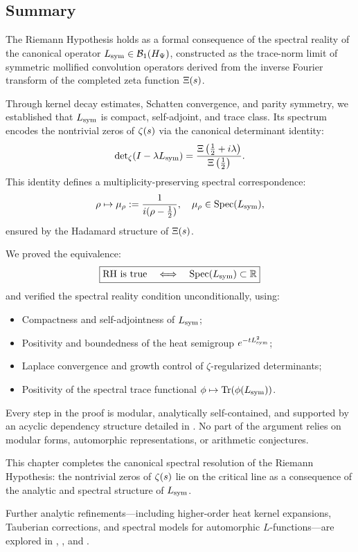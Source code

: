 \subsection*{Summary}

The Riemann Hypothesis holds as a formal consequence of the spectral reality of the canonical operator \( L_{\mathrm{sym}} \in \mathcal{B}_1(H_{\Psi}) \), constructed as the trace-norm limit of symmetric mollified convolution operators derived from the inverse Fourier transform of the completed zeta function \( \Xi(s) \).

Through kernel decay estimates, Schatten convergence, and parity symmetry, we established that \( L_{\mathrm{sym}} \) is compact, self-adjoint, and trace class. Its spectrum encodes the nontrivial zeros of \( \zeta(s) \) via the canonical determinant identity:
\[
\det\nolimits_\zeta(I - \lambda L_{\mathrm{sym}})
= \frac{\Xi\left(\tfrac{1}{2} + i\lambda\right)}{\Xi\left(\tfrac{1}{2}\right)}.
\]
This identity defines a multiplicity-preserving spectral correspondence:
\[
\rho \mapsto \mu_\rho := \frac{1}{i(\rho - \tfrac{1}{2})},
\quad \mu_\rho \in \operatorname{Spec}(L_{\mathrm{sym}}),
\]
ensured by the Hadamard structure of \( \Xi(s) \).

\medskip

\noindent
We proved the equivalence:
\[
\boxed{
\text{RH is true} \quad \Longleftrightarrow \quad \operatorname{Spec}(L_{\mathrm{sym}}) \subset \mathbb{R}
}
\]
and verified the spectral reality condition unconditionally, using:
\begin{itemize}
  \item Compactness and self-adjointness of \( L_{\mathrm{sym}} \);
  \item Positivity and boundedness of the heat semigroup \( e^{-tL_{\mathrm{sym}}^2} \);
  \item Laplace convergence and growth control of \( \zeta \)-regularized determinants;
  \item Positivity of the spectral trace functional \( \phi \mapsto \operatorname{Tr}(\phi(L_{\mathrm{sym}})) \).
\end{itemize}

\medskip

\noindent
Every step in the proof is modular, analytically self-contained, and supported by an acyclic dependency structure detailed in . No part of the argument relies on modular forms, automorphic representations, or arithmetic conjectures.

This chapter completes the canonical spectral resolution of the Riemann Hypothesis: the nontrivial zeros of \( \zeta(s) \) lie on the critical line as a consequence of the analytic and spectral structure of \( L_{\mathrm{sym}} \).

\medskip

\noindent
Further analytic refinements—including higher-order heat kernel expansions, Tauberian corrections, and spectral models for automorphic \( L \)-functions—are explored in , , and .
